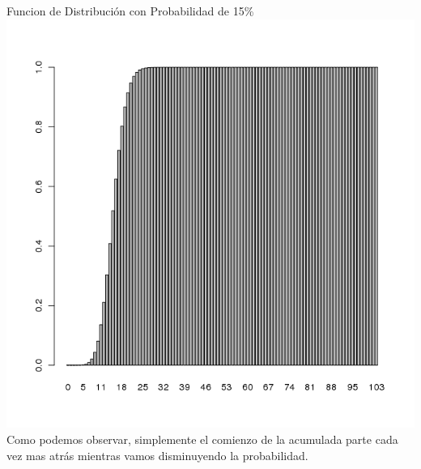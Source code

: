 \begin{itemize}
\begin{itemize}
			Funcion de Distribuci\'on con Probabilidad de 15\% \\
                        \includegraphics[scale=0.4]{images/1_1-pbinom-prob-variada2}\\
			Como podemos observar, simplemente el comienzo de la acumulada parte cada vez mas atrás mientras vamos disminuyendo la probabilidad.\\

	\end{itemize}

\end{itemize}
